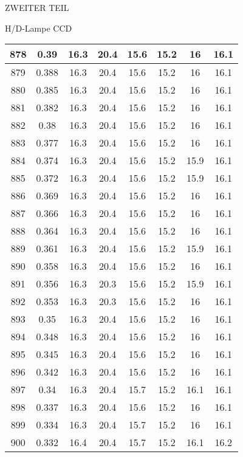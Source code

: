 \begin{appendix}
\begin{chapter}{ZWEITER TEIL}
\begin{section}{H/D-Lampe CCD}
\begin{scriptsize}
\begin{longtable}[htbp]{|c|c|c|c|c|c|c|c|}
            878 & 0.39 & 16.3 & 20.4 & 15.6 & 15.2 & 16 & 16.1 \\ \hline
            879 & 0.388 & 16.3 & 20.4 & 15.6 & 15.2 & 16 & 16.1 \\ \hline
            880 & 0.385 & 16.3 & 20.4 & 15.6 & 15.2 & 16 & 16.1 \\ \hline
            881 & 0.382 & 16.3 & 20.4 & 15.6 & 15.2 & 16 & 16.1 \\ \hline
            882 & 0.38 & 16.3 & 20.4 & 15.6 & 15.2 & 16 & 16.1 \\ \hline
            883 & 0.377 & 16.3 & 20.4 & 15.6 & 15.2 & 16 & 16.1 \\ \hline
            884 & 0.374 & 16.3 & 20.4 & 15.6 & 15.2 & 15.9 & 16.1 \\ \hline
            885 & 0.372 & 16.3 & 20.4 & 15.6 & 15.2 & 15.9 & 16.1 \\ \hline
            886 & 0.369 & 16.3 & 20.4 & 15.6 & 15.2 & 16 & 16.1 \\ \hline
            887 & 0.366 & 16.3 & 20.4 & 15.6 & 15.2 & 16 & 16.1 \\ \hline
            888 & 0.364 & 16.3 & 20.4 & 15.6 & 15.2 & 16 & 16.1 \\ \hline
            889 & 0.361 & 16.3 & 20.4 & 15.6 & 15.2 & 15.9 & 16.1 \\ \hline
            890 & 0.358 & 16.3 & 20.4 & 15.6 & 15.2 & 16 & 16.1 \\ \hline
            891 & 0.356 & 16.3 & 20.3 & 15.6 & 15.2 & 15.9 & 16.1 \\ \hline
            892 & 0.353 & 16.3 & 20.3 & 15.6 & 15.2 & 16 & 16.1 \\ \hline
            893 & 0.35 & 16.3 & 20.4 & 15.6 & 15.2 & 16 & 16.1 \\ \hline
            894 & 0.348 & 16.3 & 20.4 & 15.6 & 15.2 & 16 & 16.1 \\ \hline
            895 & 0.345 & 16.3 & 20.4 & 15.6 & 15.2 & 16 & 16.1 \\ \hline
            896 & 0.342 & 16.3 & 20.4 & 15.6 & 15.2 & 16 & 16.1 \\ \hline
            897 & 0.34 & 16.3 & 20.4 & 15.7 & 15.2 & 16.1 & 16.1 \\ \hline
            898 & 0.337 & 16.3 & 20.4 & 15.6 & 15.2 & 16 & 16.1 \\ \hline
            899 & 0.334 & 16.3 & 20.4 & 15.7 & 15.2 & 16 & 16.1 \\ \hline
            900 & 0.332 & 16.4 & 20.4 & 15.7 & 15.2 & 16.1 & 16.2 \\ \hline

\end{longtable}
\end{scriptsize}
\end{section}
\end{chapter}
\end{appendix}
